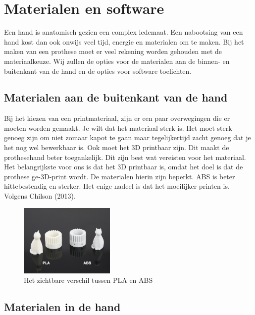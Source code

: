 \hypertarget{materialen-en-software}{%
\section{Materialen en software}\label{materialen-en-software}}

Een hand is anatomisch gezien een complex ledemaat. Een nabootsing van
een hand kost dan ook onwijs veel tijd, energie en materialen om te
maken. Bij het maken van een prothese moet er veel rekening worden
gehouden met de materiaalkeuze. Wij zullen de opties voor de materialen
aan de binnen- en buitenkant van de hand en de opties voor software
toelichten.

\hypertarget{materialen-aan-de-buitenkant-van-de-hand}{%
\subsection{Materialen aan de buitenkant van de
hand}\label{materialen-aan-de-buitenkant-van-de-hand}}

Bij het kiezen van een printmateriaal, zijn er een paar overwegingen die
er moeten worden gemaakt. Je wilt dat het materiaal sterk is. Het moet
sterk genoeg zijn om niet zomaar kapot te gaan maar tegelijkertijd zacht
genoeg dat je het nog wel bewerkbaar is. Ook moet het 3D printbaar zijn.
Dit maakt de prothesehand beter toegankelijk. Dit zijn best wat
vereisten voor het materiaal. Het belangrijkste voor ons is dat het 3D
printbaar is, omdat het doel is dat de prothese ge-3D-print wordt. De
materialen hierin zijn beperkt. ABS is beter hittebestendig en sterker.
Het enige nadeel is dat het moeilijker printen is. Volgens Chilson
(2013).

\begin{figure}
\centering
\includegraphics[width=0.41\textwidth,height=\textheight]{img/image_10.png}
\caption{Het zichtbare verschil tussen PLA en ABS\label{fig:plaabs}}
\end{figure}

\hypertarget{materialen-in-de-hand}{%
\subsection{Materialen in de hand}\label{materialen-in-de-hand}}

